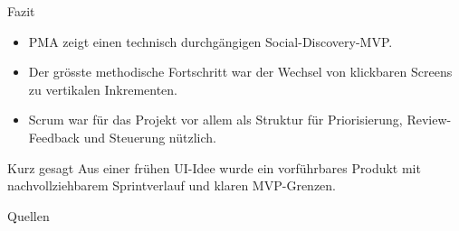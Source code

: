\documentclass[
amberg,
compressedtitleimages,
toc=fancy,
footlinebox,
nometaot
]{OTHAWbeamer}
\begin{document}
\begin{frame}{Fazit}
  \begin{itemize}
    \item PMA zeigt einen technisch durchgängigen Social-Discovery-MVP.
    \item Der grösste methodische Fortschritt war der Wechsel von klickbaren Screens zu vertikalen Inkrementen.
    \item Scrum war für das Projekt vor allem als Struktur für Priorisierung, Review-Feedback und Steuerung nützlich.
  \end{itemize}

  \vspace{0.3cm}

  \begin{block}{Kurz gesagt}
    Aus einer frühen UI-Idee wurde ein vorführbares Produkt mit nachvollziehbarem Sprintverlauf und klaren MVP-Grenzen.
  \end{block}
\end{frame}

\appendix
\nocite{scrumguide,agilemanifesto,nominatim}

\begin{frame}[allowframebreaks]{Quellen}
  \printbibliography[heading=none]
\end{frame}
\end{document}
